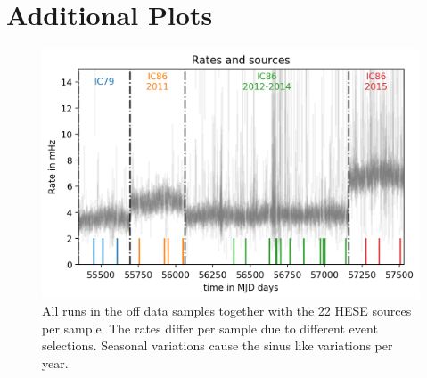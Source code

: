 \section{Additional Plots}

\begin{figure}[h]
  \centering
  \includegraphics[width=.9\textwidth]{inc/rate_all_samples.png}
  \caption{All runs in the off data samples together with the 22 HESE sources per sample. The rates differ per sample due to different event selections. Seasonal variations cause the sinus like variations per year.}
  \label{fig:rate_all_samples}
\end{figure}


